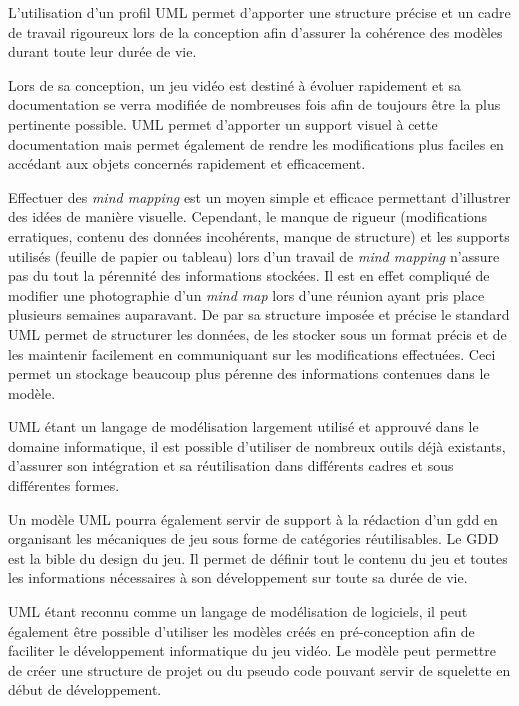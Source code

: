 L'utilisation d'un profil UML permet d'apporter une structure précise et un cadre de travail rigoureux lors de la conception afin d'assurer la cohérence des modèles durant toute leur durée de vie.

Lors de sa conception, un jeu vidéo est destiné à évoluer rapidement et sa documentation se verra modifiée de nombreuses fois afin de toujours être la plus pertinente possible. UML permet d'apporter un support visuel à cette documentation mais permet également de rendre les modifications plus faciles en accédant aux objets concernés rapidement et efficacement. 

Effectuer des \emph{mind mapping} est un moyen simple et efficace permettant d'illustrer des idées de manière visuelle. Cependant, le manque de rigueur (modifications erratiques, contenu des données incohérents, manque de structure) et les supports utilisés (feuille de papier ou tableau) lors d'un travail de \emph{mind mapping} n'assure pas du tout la pérennité des informations stockées. Il est en effet compliqué de modifier une photographie d'un \emph{mind map} lors d'une réunion ayant pris place plusieurs semaines auparavant. De par sa structure imposée et précise le standard UML permet de structurer les données, de les stocker sous un format précis et de les maintenir facilement en communiquant sur les modifications effectuées. Ceci permet un stockage beaucoup plus pérenne des informations contenues dans le modèle.

UML étant un langage de modélisation largement utilisé et approuvé dans le domaine informatique, il est possible d'utiliser de nombreux outils d\'ej\`a existants, d'assurer son intégration et sa réutilisation dans différents cadres et sous différentes formes.

Un modèle UML pourra également servir de support à la rédaction d'un \gls{gdd} en organisant les mécaniques de jeu sous forme de catégories réutilisables. Le GDD est la \guillemotleft bible du design \guillemotright \cite{GD_foundations_pedersen} du jeu. Il permet de définir tout le contenu du jeu et toutes les informations nécessaires à son développement sur toute sa durée de vie. 

UML étant reconnu comme un langage de modélisation de logiciels, il peut également être possible d'utiliser les modèles créés en pré-conception afin de faciliter le développement informatique du jeu vidéo. Le modèle peut permettre de créer une structure de projet ou du pseudo code pouvant servir de squelette en début de développement.


